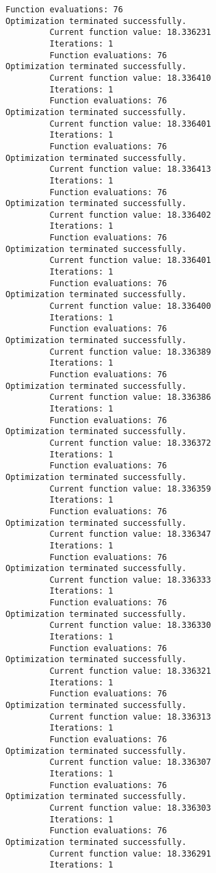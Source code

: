 \documentclass[11pt]{article}
\begin{document}
\begin{Verbatim}[commandchars=\\\{\}]
         Function evaluations: 76
Optimization terminated successfully.
         Current function value: 18.336231
         Iterations: 1
         Function evaluations: 76
Optimization terminated successfully.
         Current function value: 18.336410
         Iterations: 1
         Function evaluations: 76
Optimization terminated successfully.
         Current function value: 18.336401
         Iterations: 1
         Function evaluations: 76
Optimization terminated successfully.
         Current function value: 18.336413
         Iterations: 1
         Function evaluations: 76
Optimization terminated successfully.
         Current function value: 18.336402
         Iterations: 1
         Function evaluations: 76
Optimization terminated successfully.
         Current function value: 18.336401
         Iterations: 1
         Function evaluations: 76
Optimization terminated successfully.
         Current function value: 18.336400
         Iterations: 1
         Function evaluations: 76
Optimization terminated successfully.
         Current function value: 18.336389
         Iterations: 1
         Function evaluations: 76
Optimization terminated successfully.
         Current function value: 18.336386
         Iterations: 1
         Function evaluations: 76
Optimization terminated successfully.
         Current function value: 18.336372
         Iterations: 1
         Function evaluations: 76
Optimization terminated successfully.
         Current function value: 18.336359
         Iterations: 1
         Function evaluations: 76
Optimization terminated successfully.
         Current function value: 18.336347
         Iterations: 1
         Function evaluations: 76
Optimization terminated successfully.
         Current function value: 18.336333
         Iterations: 1
         Function evaluations: 76
Optimization terminated successfully.
         Current function value: 18.336330
         Iterations: 1
         Function evaluations: 76
Optimization terminated successfully.
         Current function value: 18.336321
         Iterations: 1
         Function evaluations: 76
Optimization terminated successfully.
         Current function value: 18.336313
         Iterations: 1
         Function evaluations: 76
Optimization terminated successfully.
         Current function value: 18.336307
         Iterations: 1
         Function evaluations: 76
Optimization terminated successfully.
         Current function value: 18.336303
         Iterations: 1
         Function evaluations: 76
Optimization terminated successfully.
         Current function value: 18.336291
         Iterations: 1

\end{Verbatim}
\end{document}
